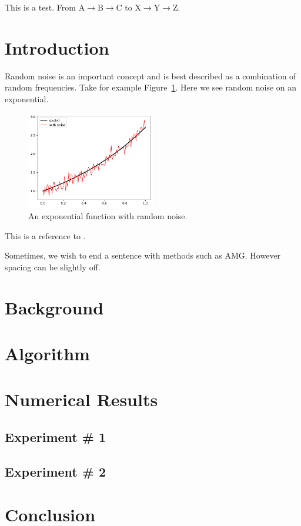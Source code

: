 \documentclass[10pt,letterpaper]{article}
\newcommand{\sequence}[3]{#1$\rightarrow$#2$\rightarrow$#3}
\begin{document}
This is a test.  From \sequence{A}{B}{C} to \sequence{X}{Y}{Z}.

\section{Introduction}

Random noise is an important concept and is best described as a combination of random frequencies.  Take for example Figure~\ref{fig:exp_with_noise}.  Here we see random noise on an exponential.
%
\begin{figure}[!ht]
  \centering
  \includegraphics[width=0.5\textwidth]{./figures/exp_with_noise.pdf}
  \caption{An exponential function with random noise.}
  \label{fig:exp_with_noise}
\end{figure}

%
This is a reference to \cite{ChOlSe_2021_lsrbm}.

Sometimes, we wish to end a sentence with methods such as AMG.  However spacing can be slightly off.

\section{Background}
\section{Algorithm}
\section{Numerical Results}
\subsection{Experiment \# 1}
\subsection{Experiment \# 2}
\section{Conclusion}




\end{document}
